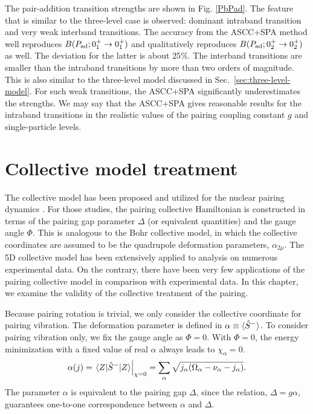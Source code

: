 \documentclass[11pt]{book} %
\begin{document}
The pair-addition transition strengths are shown in Fig. \ref{PbPad}.
The feature that is similar to the three-level case is observed:
dominant intraband transition and very weak interband transitions.
The accuracy from the ASCC+SPA method well reproduces
$B(P_{\rm ad};0_1^+\rightarrow 0_1^+)$
and qualitatively reproduces
$B(P_{\rm ad};0_2^+\rightarrow 0_2^+)$ as well.
The deviation for the latter is about $25\%$.
The interband transitions are smaller than the intraband transitions
by more than two orders of magnitude.
This is also similar to the three-level model discussed
in Sec.~\ref{sec:three-level-model}.
For such weak transitions, the ASCC+SPA significantly
underestimates the strengths.
We may say that the ASCC+SPA gives reasonable results for the intraband
transitions in the realistic values of the pairing coupling constant $g$ and
single-particle levels.



\clearpage{\pagestyle{empty}\cleardoublepage}
\chapter{Collective model treatment}
\label{collective}

The collective model has been proposed
and utilized for the nuclear pairing dynamics
\cite{BBPK70,GPBW85, ZPPRS99, P07}.
For those studies, the pairing collective Hamiltonian is constructed
in terms of the pairing gap parameter $\Delta$ (or equivalent quantities) 
and the gauge angle $\Phi$.  
This is analogous to the Bohr collective model,
in which the collective coordinates are assumed to be the
quadrupole deformation parameters, $\alpha_{2\mu}$.
The 5D collective model has been 
extensively applied to analysis on numerous experimental data.
On the contrary, there have been very few applications of
the pairing collective model
in comparison with experimental data.
In this chapter, we examine the validity of
the collective treatment of the pairing.

Because pairing rotation is trivial, we only consider the collective coordinate for pairing vibration. The deformation parameter is defined in $\alpha\equiv \braket{ \hat{S}^- }$. 
To consider pairing vibration only, we fix the gauge angle as $\Phi=0$.
With $\Phi=0$, the energy minimization with a fixed value of real $\alpha$ always
leads to $\chi_{\alpha}=0$.
\begin{align}
\alpha(j) = \left. \braket{Z|\hat{S}^-|Z} \right|_{\chi=0}
	= \sum_{\alpha} \sqrt{j_{\alpha}(\Omega_{\alpha}-\nu_{\alpha}-j_{\alpha})} .
 \label{Delta}
\end{align}
The parameter $\alpha$ is equivalent to the pairing gap $\Delta$,
since the relation, $\Delta=g\alpha$,
guarantees one-to-one correspondence between $\alpha$ and $\Delta$. 
\end{document}
